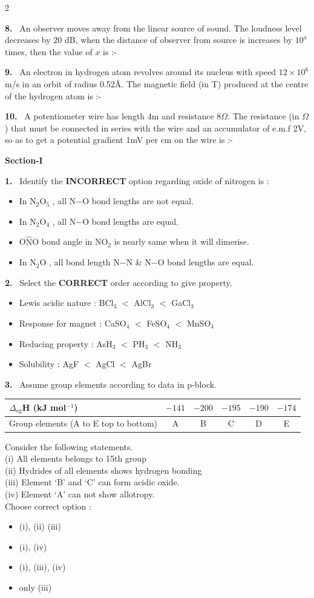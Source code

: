 \documentclass[10pt]{extarticle}
\newcommand{\partsec}[2]{\par\medskip\noindent{\large\bfseries PART-#1: #2}\par\smallskip}
\newcommand{\sect}[1]{\par\smallskip\noindent\textbf{#1}\par}
\newcommand{\qn}[1]{\par\smallskip\noindent\textbf{#1.}~}
\newenvironment{qoptions}{\begin{itemize}[leftmargin=1.8em,itemsep=1pt,topsep=2pt,label={}]}{\end{itemize}}
\newcommand{\opt}[2]{\item[(#1)] #2}
\begin{document}
\begin{multicols}{2}
\qn{8} An observer moves away from the linear source of sound. The loudness level decreases by 20 dB, when the distance of observer from source is increases by $10^x$ times, then the value of $x$ is :-

\qn{9} An electron in hydrogen atom revolves around its nucleus with speed $12\times10^6$ m/s in an orbit of radius 0.52\AA. The magnetic field (in T) produced at the centre of the hydrogen atom is :-

\qn{10} A potentiometer wire has length 4m and resistance 8$\Omega$. The resistance (in $\Omega$) that must be connected in series with the wire and an accumulator of e.m.f 2V, so as to get a potential gradient 1mV per cm on the wire is :-

\partsec{2}{CHEMISTRY}
\sect{Section-I}

\qn{1} Identify the \textbf{INCORRECT} option regarding oxide of nitrogen is :
\begin{qoptions}
\opt{A}{In N$_2$O$_5$ , all N$-$O bond lengths are not equal.}
\opt{B}{In N$_2$O$_4$ , all N$-$O bond lengths are equal.}
\opt{C}{O$\widehat{\text{N}}$O bond angle in NO$_2$ is nearly same when it will dimerise.}
\opt{D}{In N$_2$O , all bond length N$-$N \& N$-$O bond lengths are equal.}
\end{qoptions}

\qn{2} Select the \textbf{CORRECT} order according to give property.
\begin{qoptions}
\opt{A}{Lewis acidic nature : BCl$_3$ $<$ AlCl$_3$ $<$ GaCl$_3$}
\opt{B}{Response for magnet : CaSO$_4$ $<$ FeSO$_4$ $<$ MnSO$_4$}
\opt{C}{Reducing property : AsH$_3$ $<$ PH$_3$ $<$ NH$_3$}
\opt{D}{Solubility : AgF $<$ AgCl $<$ AgBr}
\end{qoptions}

\qn{3} Assume group elements according to data in p-block.
\par\nobreak
\begin{center}
\begin{tabular}{|p{1.7cm}|c|c|c|c|c|}\hline
\footnotesize$\Delta_{\text{eg}}$H (kJ mol$^{-1}$) & \footnotesize$-141$ & \footnotesize$-200$ & \footnotesize$-195$ & \footnotesize$-190$ & \footnotesize$-174$\\\hline
\footnotesize Group elements (A to E top to bottom) & A & B & C & D & E\\\hline
\end{tabular}
\end{center}
Consider the following statements.\\
(i) All elements belongs to 15th group\\
(ii) Hydrides of all elements shows hydrogen bonding\\
(iii) Element `B' and `C' can form acidic oxide.\\
(iv) Element `A' can not show allotropy.\\
Choose correct option :
\begin{qoptions}
\opt{A}{(i), (ii) (iii)}
\opt{B}{(i), (iv)}
\opt{C}{(i), (iii), (iv)}
\opt{D}{only (iii)}
\end{qoptions}


\end{multicols}
\end{document}
